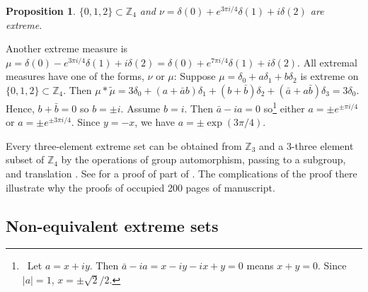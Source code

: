 \documentclass[letter,11pt]{amsart}
\numberwithin{theorem}{section}
\newtheorem{prop}[theorem]{Proposition}
\theoremstyle{remark}
\numberwithin{equation}{section}
\newcommand\Zp[2]{\texttt{$\mathbb Z_{#1}^{\	#2}$}}
\newcommand\omitproof[1]{} %
\begin{document}
\begin{prop}\cite{MR627683}\label{prop3in4}
 $\{0,1,2\}\subset \Zp4{}$ and $\nu = \delta(0) + e^{3\pi i/4}\delta(1) +i\delta(2)$ are extreme.
\end{prop}
\omitproof{
\begin{proof}
Then
\begin{align*}
\widehat\nu(0) &= 1- \frac{\sqrt2}2 + \frac{\sqrt2}2i +i, \text{ so }
\\  
|\widehat\nu(0)| &= \big|(1-\frac{\sqrt2}2)^2 +(1+\frac{\sqrt2}2)^2\big|^{1/2} =\sqrt3.
\\
\widehat\nu(1) &= 1 -\frac{\sqrt2}2 -\frac{\sqrt2}2i -i, \text{ so }
|\widehat\nu(1)|=  \sqrt3\\
\widehat\nu(2) & = 1 +\frac{\sqrt2}2 -\frac{\sqrt2}2i +i \text{, so } |\widehat\nu(2)|= \sqrt3.
\\
\widehat\nu(3) & = 1  +\frac{\sqrt2}2 +\frac{\sqrt2}2i -i, \text{ so } 
|\widehat\nu(3)| = \sqrt3.\qedhere
\end{align*}
\end{proof}
}
Another extreme measure is $\mu=\delta(0) - e^{3\pi i/4}\delta(1) + i\delta(2)
=\delta(0) + e^{7\pi i/4}\delta(1) + i\delta(2)$.
All extremal measures have one of the forms, $\nu$ or $\mu$:
Suppose $\mu=\delta_0+a\delta_1+b\delta_2$ is extreme on $\{0,1,2\}\subset \Zp4{}$. Then
$\mu*\tilde\mu=3\delta_0+(a+\bar ab)\delta_1 + (b+\bar b)\delta_2 +
(\bar a+a\bar b)\delta_3=3\delta_0$.
Hence, $b+\bar b=0$ so $b=\pm i$. Assume $b=i$. Then 
$\bar a-ia=0$ so\footnote{\ 
Let $a= x+iy$. Then $\bar{a}-ia= x-iy-ix+y=0$ means $x+y=0$. Since 
$|a|=1$, $x= \pm\sqrt2/2$.}
either $a=\pm e^{\pm\pi i/4}$ or $a =\pm e^{\pm 3\pi i/4}$. 
Since $y=-x$, we have $a=\pm \exp(3\pi /4).$


\medskip
Every three-element extreme set can be obtained from \Zp{3}{} and a 3-three element subset of \Zp{4}{}
by the operations of group automorphism, passing to a subgroup, and translation
\cite[3.1(ii)]{MR627683}. See \cite{ABeastiaryAppendix} for a proof of part of \cite[3.1(ii)]{MR627683}. The complications of the proof there illustrate
 why the proofs
of \cite[3.1-3.3]{MR627683} occupied 200 pages of manuscript.

 

\subsection{Non-equivalent extreme sets}
\end{document}
